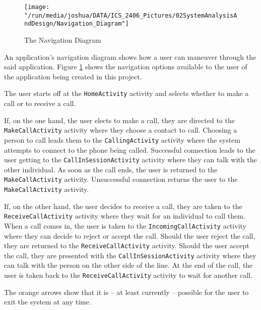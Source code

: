 \documentclass[12pt,svgnames,smaller]{article} %
\begin{document}
	\begin{figure}
		\centering
		\texttt{[image: "/run/media/joshua/DATA/ICS\_2406\_Pictures/02SystemAnalysisAndDesign/Navigation\_Diagram"]}
		\caption{The Navigation Diagram}
		\label{fig:SystemAnalysisandDesign-Navigation_Diagram}
	\end{figure}
	
	An application’s navigation diagram shows how a user can maneuver through the said application. Figure \ref{fig:SystemAnalysisandDesign-Navigation_Diagram} shows the navigation options available to the user of the application being created in this project.
	
	The user starts off at the \texttt{HomeActivity} activity and selects whether to make a call or to receive a call.
	
	If, on the one hand, the user elects to make a call, they are directed to the \texttt{MakeCallActivity} activity where they choose a contact to call. Choosing a person to call leads them to the \texttt{CallingActivity} activity where the system attempts to connect to the phone being called. Successful connection leads to the user getting to the \texttt{CallInSessionActivity} activity where they can talk with the other individual. As soon as the call ends, the user is returned to the \texttt{MakeCallActivity} activity. Unsuccessful connection returns the user to the \texttt{MakeCallActivity} activity.

	If, on the other hand, the user decides to receive a call, they are taken to the \texttt{ReceiveCallActivity} activity where they wait for an individual to call them. When a call comes in, the user is taken to the \texttt{IncomingCallActivity} activity where they can decide to reject or accept the call. Should the user reject the call, they are returned to the \texttt{ReceiveCallActivity} activity. Should the user accept the call, they are presented with the \texttt{CallInSessionActivity} activity where they can talk with the person on the other side of the line. At the end of the call, the user is taken back to the \texttt{ReceiveCallActivity} activity to wait for another call.
	
	The orange arrows show that it is – at least currently – possible for the user to exit the system at any time.	
	
	
	
\end{document}
